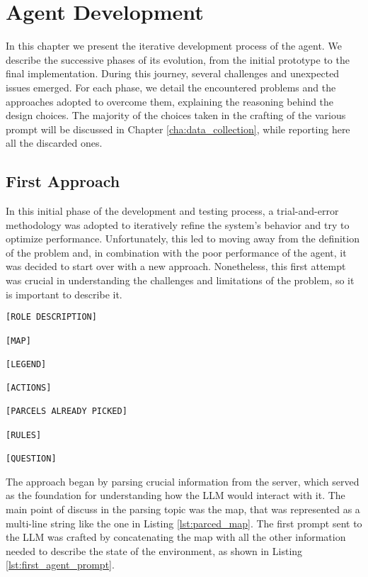 \chapter{Agent Development}
\label{cha:agent_development}

In this chapter we present the iterative development process of the agent. We describe
the successive phases of its evolution, from the initial prototype to the final
implementation. During this journey, several challenges and unexpected issues
emerged. For each phase, we detail the encountered problems and the approaches
adopted to overcome them, explaining the reasoning behind the design choices.
The majority of the choices taken in the crafting of the various prompt will be
discussed in Chapter \ref{cha:data_collection}, while reporting here all the discarded
ones.

\section{First Approach}
\label{sec:first_approach}

In this initial phase of the development and testing process, a trial-and-error methodology
was adopted to iteratively refine the system's behavior and try to optimize performance.
Unfortunately, this led to moving away from the definition of the problem and,
in combination with the poor performance of the agent, it was decided to start over
with a new approach. Nonetheless, this first attempt was crucial in understanding
the challenges and limitations of the problem, so it is important to describe it.

\vspace{1mm}
\begin{codewindow}
  [Text]  \begin{lstlisting}
[ROLE DESCRIPTION]

[MAP]

[LEGEND]

[ACTIONS]

[PARCELS ALREADY PICKED]

[RULES]

[QUESTION]
\end{lstlisting}
\end{codewindow}
\vspace{1mm}

The approach began by parsing crucial information from the server, which served
as the foundation for understanding how the LLM would interact with it. The main
point of discuss in the parsing topic was the map, that was represented as a
multi-line string like the one in Listing \ref{lst:parced_map}. The first prompt
sent to the LLM was crafted by concatenating the map with all the other information
needed to describe the state of the environment, as shown in Listing
\ref{lst:first_agent_prompt}.


